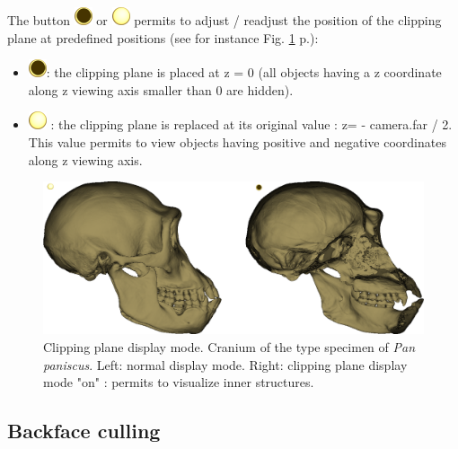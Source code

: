 The button \includegraphics[scale=0.7]{images/06/display/cpon.png} or \includegraphics[scale=0.5]{images/06/display/cpoff.png}  permits to adjust / readjust the position of the clipping plane at predefined positions (see for instance Fig. \ref{cp_example} p.\pageref{cp_example}):
\begin{itemize}
\item  \includegraphics[scale=0.7]{images/06/display/cpon.png}: the clipping plane is placed at z = 0 (all objects having a z coordinate along
z viewing axis smaller than 0 are hidden).
\item	\includegraphics[scale=0.7]{images/06/display/cpoff.png} : the clipping plane is replaced at its original value : z= - camera.far / 2. This value permits to
view objects having positive and negative coordinates along z viewing axis.

\end{itemize}
\begin{figure}
  \centering
  \includegraphics[scale=0.4]{images/06/display/cp_example.png} 
	\caption{Clipping plane display mode. Cranium of the type specimen of \textit{Pan paniscus}. Left: normal display mode. Right: clipping plane display mode "on" : permits to visualize inner structures. }
\label{cp_example}
 
\end{figure}



\subsection{Backface culling} \label{Backface_culling}

